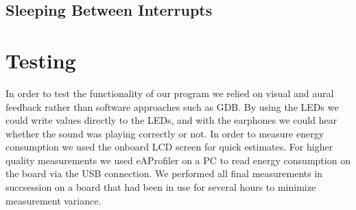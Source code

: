 \subsection{Sleeping Between Interrupts}



\section{Testing}
In order to test the functionality of our program we relied on visual and aural feedback rather than software approaches such as GDB. By using the LEDs we could write values directly to the LEDs, and with the earphones we could hear whether the sound was playing correctly or not. In order to measure energy consumption we used the onboard LCD screen for quick estimates. For higher quality measurements we used eAProfiler on a PC to read energy consumption on the board via the USB connection. We performed all final measurements in succsession on a board that had been in use for several hours to minimize measurement variance. 
